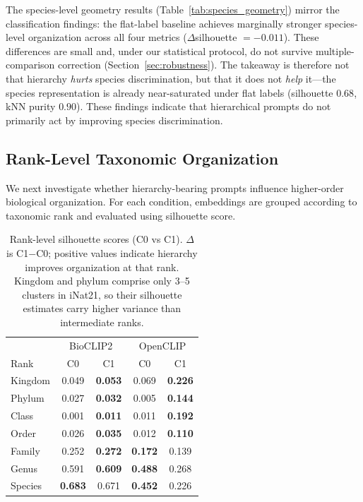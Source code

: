 The species-level geometry results (Table~\ref{tab:species_geometry}) mirror the
classification findings: the flat-label baseline achieves marginally stronger
species-level organization across all four metrics ($\Delta$silhouette $=-0.011$). These differences are small and,
under our statistical protocol, do not survive multiple-comparison correction
(Section~\ref{sec:robustness}). The takeaway is therefore not that hierarchy
\emph{hurts} species discrimination, but that it does not \emph{help} it---the
species representation is already near-saturated under flat labels
(silhouette $0.68$, kNN purity $0.90$). These findings indicate that hierarchical
prompts do not primarily act by improving species discrimination.

\subsection{Rank-Level Taxonomic Organization}
\label{sec:rank}

We next investigate whether hierarchy-bearing prompts influence higher-order
biological organization. For each condition, embeddings are grouped according to
taxonomic rank and evaluated using silhouette score.

\begin{table}[t]
\centering
\caption{Rank-level silhouette scores (C0 vs C1). $\Delta$ is C1$-$C0; positive
values indicate hierarchy improves organization at that rank. Kingdom and phylum
comprise only 3--5 clusters in iNat21, so their silhouette estimates carry higher
variance than intermediate ranks.}
\label{tab:rank_geometry}
\begin{tabular}{lcccc}
\hline
 & \multicolumn{2}{c}{BioCLIP2} & \multicolumn{2}{c}{OpenCLIP} \\
Rank & C0 & C1 & C0 & C1 \\
\hline
Kingdom & 0.049 & \textbf{0.053} & 0.069 & \textbf{0.226} \\
Phylum  & 0.027 & \textbf{0.032} & 0.005 & \textbf{0.144} \\
Class   & 0.001 & \textbf{0.011} & 0.011 & \textbf{0.192} \\
Order   & 0.026 & \textbf{0.035} & 0.012 & \textbf{0.110} \\
Family  & 0.252 & \textbf{0.272} & \textbf{0.172} & 0.139 \\
Genus   & 0.591 & \textbf{0.609} & \textbf{0.488} & 0.268 \\
Species & \textbf{0.683} & 0.671 & \textbf{0.452} & 0.226 \\
\hline
\end{tabular}
\end{table}

